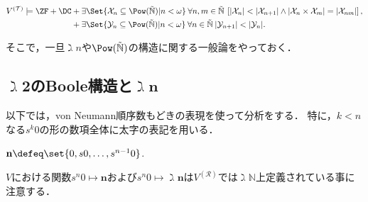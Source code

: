 \documentclass[realisability.tex]{subfiles}
\begin{document}
\begin{theorem}[Krivine]\label{thm:patho-sets-of-reals}
 \[
  V^{(\mathcal{T})}
   \models \ZF + \DC
    \begin{aligned}[t]
     &+\exists \Set{ \mathcal{X}_n \subseteq \Pow(\NN) | n < \omega } \:
     \forall n, m \in \NN \:
    \left[|\mathcal{X}_{n}| < |\mathcal{X}_{n+1}| \land |\mathcal{X}_n \times \mathcal{X}_m| = |\mathcal{X}_{nm}|\right],\\
     &+ \exists \Set{ \mathcal{Y}_n \subseteq \Pow(\NN) | n <\omega} \: \forall n \in\NN \:
       |\mathcal{Y}_{n+1}| < |\mathcal{Y}_n|.
    \end{aligned}
 \]
\end{theorem}

そこで，一旦$\gimel n$や$\Pow(\NN)$の構造に関する一般論をやっておく．

\subsection{$\gimel \mathbf{2}$のBoole構造と$\gimel \mathbf{n}$}
以下では，von Neumann順序数もどきの表現を使って分析をする．
特に，$k < n$なる$s^k 0$の形の数項全体に太字の表記を用いる．
\begin{notation}
 $\mathbf{n} \defeq \set{0, s0, \dots, s^{n-1} 0}$.

 $V$における関数$s^n 0 \mapsto \mathbf{n}$および$s^n 0 \mapsto \gimel \mathbf{n}$は$V^{(\mathcal{R})}$では$\gimel \mathbb{N}$上定義されている事に注意する．
\end{notation}
\end{document}
